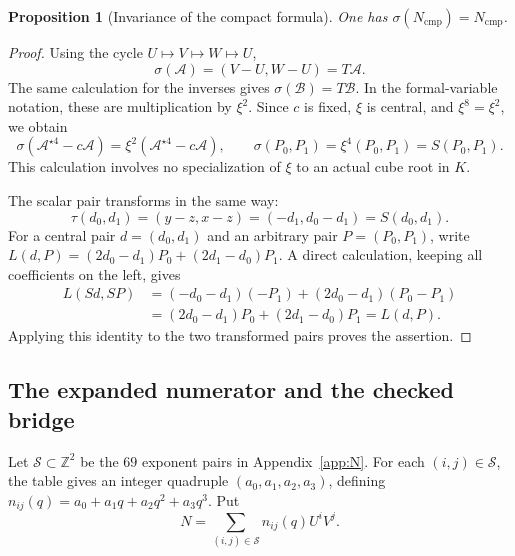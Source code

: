 \documentclass[11pt,letterpaper]{article}
\newtheorem{proposition}[theorem]{Proposition}
\theoremstyle{definition}
\theoremstyle{remark}
\newcommand{\ZZ}{\mathbb Z}
\begin{document}
\begin{proposition}[Invariance of the compact formula]\label{prop:invariance}
One has $\sigma(N_{\mathrm{cmp}})=N_{\mathrm{cmp}}$.
\end{proposition}
\begin{proof}
Using the cycle $U\mapsto V\mapsto W\mapsto U$,
\[
\sigma(\mathcal A)=(V-U,W-U)=T\mathcal A.
\]
The same calculation for the inverses gives
$\sigma(\mathcal B)=T\mathcal B$. In the formal-variable notation, these
are multiplication by $\xi^2$. Since $c$ is fixed, $\xi$ is central, and
$\xi^8=\xi^2$, we obtain
\[
\sigma(\mathcal A^{\star4}-c\mathcal A)
 =\xi^2(\mathcal A^{\star4}-c\mathcal A),\qquad
\sigma(P_0,P_1)=\xi^4(P_0,P_1)=S(P_0,P_1).
\]
This calculation involves no specialization of $\xi$ to an actual cube
root in $K$.

The scalar pair transforms in the same way:
\[
\tau(d_0,d_1)=(y-z,x-z)=(-d_1,d_0-d_1)=S(d_0,d_1).
\]
For a central pair $d=(d_0,d_1)$ and an arbitrary pair $P=(P_0,P_1)$,
write $L(d,P)=(2d_0-d_1)P_0+(2d_1-d_0)P_1$.
A direct calculation, keeping all coefficients on the left, gives
\begin{align*}
L(Sd,SP)
 &=(-d_0-d_1)(-P_1)+(2d_0-d_1)(P_0-P_1)\\
 &=(2d_0-d_1)P_0+(2d_1-d_0)P_1=L(d,P).
\end{align*}
Applying this identity to the two transformed pairs proves the assertion.
\end{proof}

\subsection{The expanded numerator and the checked bridge}

Let $\mathcal S\subset\ZZ^2$ be the $69$ exponent pairs in
Appendix~\ref{app:N}. For each $(i,j)\in\mathcal S$, the table gives an
integer quadruple $(a_0,a_1,a_2,a_3)$, defining
$n_{ij}(q)=a_0+a_1q+a_2q^2+a_3q^3$. Put
\begin{equation}\label{eq:Nexpanded}
N=\sum_{(i,j)\in\mathcal S}n_{ij}(q)U^iV^j.
\end{equation}
\end{document}
